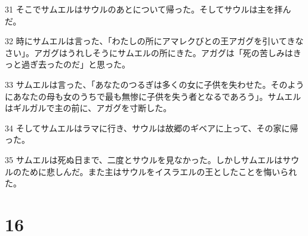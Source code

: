 \par 31 そこでサムエルはサウルのあとについて帰った。そしてサウルは主を拝んだ。
\par 32 時にサムエルは言った、「わたしの所にアマレクびとの王アガグを引いてきなさい」。アガグはうれしそうにサムエルの所にきた。アガグは「死の苦しみはきっと過ぎ去ったのだ」と思った。
\par 33 サムエルは言った、「あなたのつるぎは多くの女に子供を失わせた。そのようにあなたの母も女のうちで最も無惨に子供を失う者となるであろう」。サムエルはギルガルで主の前に、アガグを寸断した。
\par 34 そしてサムエルはラマに行き、サウルは故郷のギベアに上って、その家に帰った。
\par 35 サムエルは死ぬ日まで、二度とサウルを見なかった。しかしサムエルはサウルのために悲しんだ。また主はサウルをイスラエルの王としたことを悔いられた。

\chapter{16}

